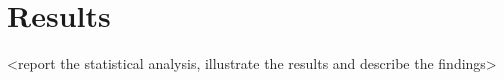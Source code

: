 \section{Results}
<report the statistical analysis, illustrate the results and describe the findings>
